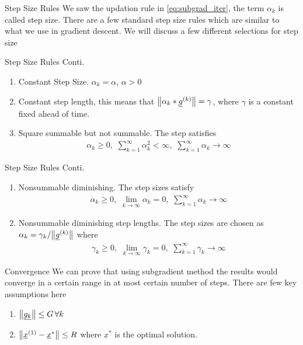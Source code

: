 \documentclass{beamer}
\renewcommand{\vec}[1]{\underline{#1}}
\begin{document}
\begin{frame}{Step Size Rules}
    We saw the updation rule in \eqref{eq:subgrad_iter}, the term $\alpha_k$ is called step size. There are a few standard step size rules which are similar to what we use in gradient descent. We will discuss a few different selections for step size
\end{frame}
\begin{frame}{Step Size Rules Conti.}
    \begin{enumerate}
        \item Constant Step Size. $\alpha_k = \alpha$, $\alpha>0$
        \item Constant step length, this means that $\norm{\alpha_k*\vec{g}^{(k)}} = \gamma$, where $\gamma$ is a constant fixed ahead of time.
        \item Square summable but not summable. The step satisfies 
        \begin{align}
            \displaystyle\alpha_k\geq 0,\,\, \sum_{k=1}^\infty \alpha_k^2 < \infty,\,\, \sum_{k=1}^\infty \alpha_k \to \infty
        \end{align}
    \end{enumerate}
\end{frame}
\begin{frame}{Step Size Rules Conti.}
    \begin{enumerate}[4]
        \item Nonsummable diminishing. The step sizes satisfy
        \begin{align}
            \displaystyle \alpha_k \geq 0,\,\, \lim_{k \to \infty} \alpha_k = 0,\,\, \sum_{k=1}^\infty \alpha_k \to \infty
        \end{align}
        \item Nonsummable diminishing step lengths. The step sizes are chosen as $\alpha_k = \gamma_k /\norm{\vec{g}^{(k)}}$ where
        \begin{align}
            \displaystyle \gamma_k \geq 0,\,\, \lim_{k \to \infty} \gamma_k = 0,\,\, \sum_{k=1}^\infty \gamma_k \to \infty
        \end{align}
    \end{enumerate}
\end{frame}

\begin{frame}{Convergence}
    We can prove that using subgradient method the results would converge in a certain range in at most certain number of steps. There are few key assumptions here
    \begin{enumerate}
        \item $\norm{\vec{g_k}} \leq G\, \forall k$
        \item $\norm{\vec{x}^{(1)}-\vec{x}^*} \leq R$ where $\vec{x}^*$ is the optimal solution.
    \end{enumerate}
\end{frame}
\end{document}
